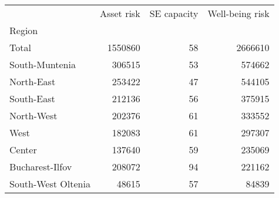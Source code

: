 \begin{tabular}{lrrr}
\toprule
{} &  Asset risk &  SE capacity &  Well-being risk \\
Region             &             &              &                  \\
\midrule
Total              &     1550860 &           58 &          2666610 \\
South-Muntenia     &      306515 &           53 &           574662 \\
North-East         &      253422 &           47 &           544105 \\
South-East         &      212136 &           56 &           375915 \\
North-West         &      202376 &           61 &           333552 \\
West               &      182083 &           61 &           297307 \\
Center             &      137640 &           59 &           235069 \\
Bucharest-Ilfov    &      208072 &           94 &           221162 \\
South-West Oltenia &       48615 &           57 &            84839 \\
\bottomrule
\end{tabular}
